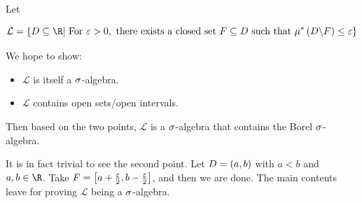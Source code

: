 \documentclass[
]{article}
\begin{document}
Let

\[\mathcal L = \brace{D\se \R |\text{ For }\ve >0, \text{ there exists a closed set }F\se D \text{ such that }\mu^*\pr{D\c F}\le \ve}\]

We hope to show:

\begin{itemize}
\item
  \(\mathcal L\) is itself a \(\sigma\)-algebra.
\item
  \(\mathcal L\) contains open sets/open intervals.
\end{itemize}

Then based on the two points, \(\mathcal L\) is a \(\sigma\)-algebra that
contains the Borel \(\sigma\)-algebra.

It is in fact trivial to see the second point. Let \(D = \left(a,b\right)\) with
\(a<b\) and \(a,b\in \R\). Take
\(F = \left[a+\frac{\varepsilon}2,b-\frac{\varepsilon}2\right]\), and then we are done. The main
contents leave for proving \(\mathcal L\) being a \(\sigma\)-algebra.
\end{document}
